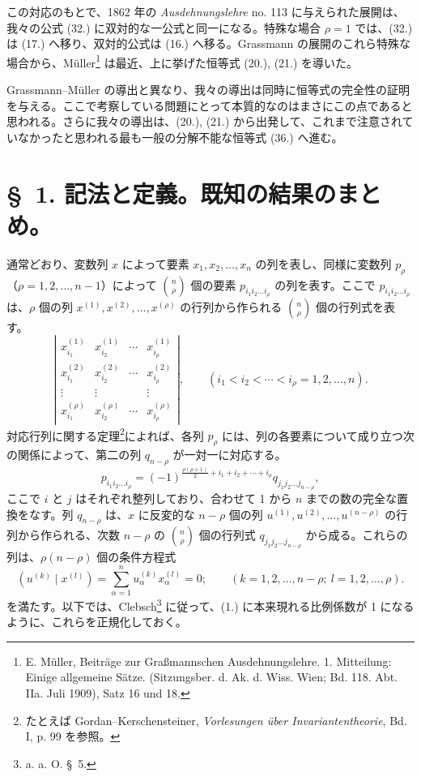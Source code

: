 \documentclass[11pt]{article}
\begin{document}
この対応のもとで、1862 年の \emph{Ausdehnungslehre} no. 113 に与えられた展開は、我々の公式 (32.) に双対的な一公式と同一になる。特殊な場合 $\rho=1$ では、(32.) は (17.) へ移り、双対的公式は (16.) へ移る。Grassmann の展開のこれら特殊な場合から、Müller\footnote{E. Müller, Beiträge zur Graßmannschen Ausdehnungslehre. 1. Mitteilung: Einige allgemeine Sätze. (Sitzungsber. d. Ak. d. Wiss. Wien; Bd. 118. Abt. IIa. Juli 1909), Satz 16 und 18.} は最近、上に挙げた恒等式 (20.), (21.) を導いた。

Grassmann--Müller の導出と異なり、我々の導出は同時に恒等式の完全性の証明を与える。ここで考察している問題にとって本質的なのはまさにこの点であると思われる。さらに我々の導出は、(20.), (21.) から出発して、これまで注意されていなかったと思われる最も一般の分解不能な恒等式 (36.) へ進む。

\section*{\S\ 1. 記法と定義。既知の結果のまとめ。}
通常どおり、変数列 $x$ によって要素 $x_1,x_2,\ldots,x_n$ の列を表し、同様に変数列 $p_\rho$（$\rho=1,2,\ldots,n-1$）によって $\binom n\rho$ 個の要素 $p_{i_1i_2\ldots i_\rho}$ の列を表す。ここで $p_{i_1i_2\ldots i_\rho}$ は、$\rho$ 個の列 $x^{(1)},x^{(2)},\ldots,x^{(\rho)}$ の行列から作られる $\binom n\rho$ 個の行列式を表す。
\[
\left|\begin{array}{cccc}
 x_{i_1}^{(1)}&x_{i_2}^{(1)}&\cdots&x_{i_\rho}^{(1)}\\
 x_{i_1}^{(2)}&x_{i_2}^{(2)}&\cdots&x_{i_\rho}^{(2)}\\
 \vdots&\vdots&&\vdots\\
 x_{i_1}^{(\rho)}&x_{i_2}^{(\rho)}&\cdots&x_{i_\rho}^{(\rho)}
\end{array}\right|,
\qquad (i_1<i_2<\cdots<i_\rho=1,2,\ldots,n).
\]
対応行列に関する定理\footnote{たとえば Gordan--Kerschensteiner, \emph{Vorlesungen über Invariantentheorie}, Bd. I, p. 99 を参照。}によれば、各列 $p_\rho$ には、列の各要素について成り立つ次の関係によって、第二の列 $q_{n-\rho}$ が一対一に対応する。
\begin{equation}
 p_{i_1i_2\ldots i_\rho}=(-1)^{\frac{\rho(\rho+1)}{2}+i_1+i_2+\cdots+i_\rho}q_{j_1j_2\ldots j_{n-\rho}},
\tag{1}
\end{equation}
ここで $i$ と $j$ はそれぞれ整列しており、合わせて 1 から $n$ までの数の完全な置換をなす。列 $q_{n-\rho}$ は、$x$ に反変的な $n-\rho$ 個の列 $u^{(1)},u^{(2)},\ldots,u^{(n-\rho)}$ の行列から作られる、次数 $n-\rho$ の $\binom n\rho$ 個の行列式 $q_{j_1j_2\ldots j_{n-\rho}}$ から成る。これらの列は、$\rho(n-\rho)$ 個の条件方程式
\begin{equation}
 (u^{(k)}\mid x^{(l)})=\sum_{\alpha=1}^{n}u_\alpha^{(k)}x_\alpha^{(l)}=0;
 \qquad (k=1,2,\ldots,n-\rho;\ l=1,2,\ldots,\rho).
\tag{2}
\end{equation}
を満たす。以下では、Clebsch\footnote{a. a. O. \S\ 5.} に従って、(1.) に本来現れる比例係数が 1 になるように、これらを正規化しておく。
\end{document}
